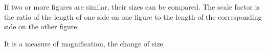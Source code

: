 If two or more figures are similar, their sizes can be compared. The scale factor 
is the ratio of the length of one side on one figure to the length of the corresponding 
side on the other figure.  

\par
It is a measure of magnification, the change of size.